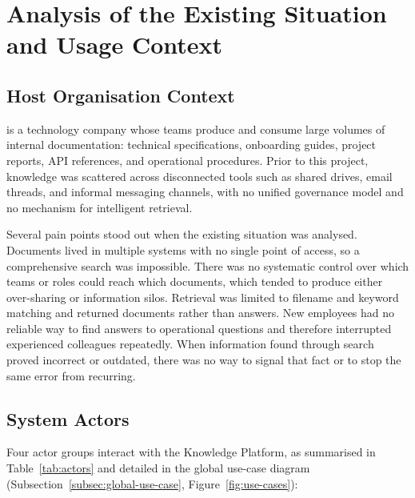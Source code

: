 \section{Analysis of the Existing Situation and Usage Context}

\subsection{Host Organisation Context}

\textbf{\CompanyName} is a technology company whose teams produce and consume
large volumes of internal documentation: technical specifications, onboarding
guides, project reports, API references, and operational procedures. Prior to this
project, knowledge was scattered across disconnected tools such as shared drives,
email threads, and informal messaging channels, with no unified governance model and
no mechanism for intelligent retrieval.

Several pain points stood out when the existing situation was analysed.
Documents lived in multiple systems with no single point of access, so a
comprehensive search was impossible. There was no systematic control over which
teams or roles could reach which documents, which tended to produce either
over-sharing or information silos. Retrieval was limited to filename and keyword
matching and returned documents rather than answers. New employees had no reliable
way to find answers to operational questions and therefore interrupted experienced
colleagues repeatedly. When information found through search proved incorrect or
outdated, there was no way to signal that fact or to stop the same error from
recurring.

\subsection{System Actors}

Four actor groups interact with the Knowledge Platform, as summarised in
Table~\ref{tab:actors} and detailed in the global use-case diagram
(Subsection~\ref{subsec:global-use-case}, Figure~\ref{fig:use-cases}):

